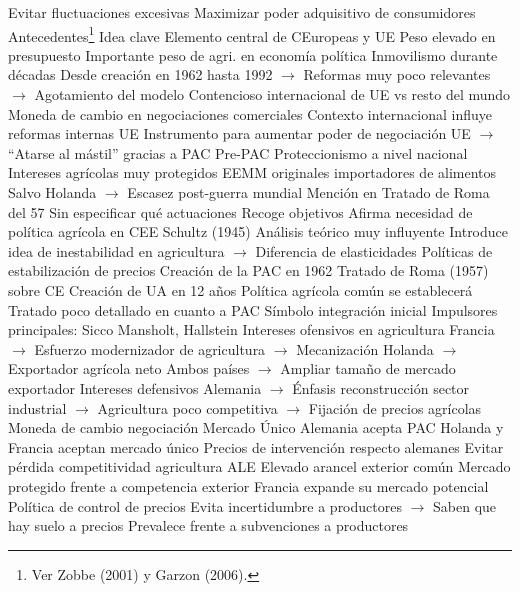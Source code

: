 \documentclass{nuevotema}
\begin{document}
\begin{esquemal}
				\4 Evitar fluctuaciones excesivas
				\4 Maximizar poder adquisitivo de consumidores
		\2 Antecedentes\footnote{Ver Zobbe (2001) y Garzon (2006).}
			\3 Idea clave
				\4 Elemento central de CEuropeas y UE
				\4[] Peso elevado en presupuesto
				\4[] Importante peso de agri. en economía política
				\4 Inmovilismo durante décadas
				\4[] Desde creación en 1962 hasta 1992
				\4[] $\to$ Reformas muy poco relevantes
				\4[] $\to$ Agotamiento del modelo
				\4 Contencioso internacional de UE vs resto del mundo
				\4[] Moneda de cambio en negociaciones comerciales
				\4[] Contexto internacional influye reformas internas UE
				\4[] Instrumento para aumentar poder de negociación UE
				\4[] $\to$ ``Atarse al mástil'' gracias a PAC
			\3 Pre-PAC
				\4 Proteccionismo a nivel nacional
				\4 Intereses agrícolas muy protegidos
				\4 EEMM originales importadores de alimentos
				\4[] Salvo Holanda
				\4[] $\to$ Escasez post-guerra mundial
				\4 Mención en Tratado de Roma del 57
				\4[] Sin especificar qué actuaciones
				\4[] Recoge objetivos
				\4[] Afirma necesidad de política agrícola en CEE
				\4 Schultz (1945)
				\4[] Análisis teórico muy influyente
				\4[] Introduce idea de inestabilidad en agricultura
				\4[] $\to$ Diferencia de elasticidades
				\4[] Políticas de estabilización de precios
			\3 Creación de la PAC en 1962
				\4 Tratado de Roma (1957) sobre CE
				\4[] Creación de UA en 12 años
				\4[] Política agrícola común se establecerá
				\4[] Tratado poco detallado en cuanto a PAC
				\4 Símbolo integración inicial
				\4 Impulsores principales:
				\4[] Sicco Mansholt, Hallstein
				\4 Intereses ofensivos en agricultura
				\4[] Francia
				\4[] $\to$ Esfuerzo modernizador de agricultura
				\4[] $\to$ Mecanización
				\4[] Holanda
				\4[] $\to$ Exportador agrícola neto
				\4[] Ambos países
				\4[] $\to$ Ampliar tamaño de mercado exportador
				\4 Intereses defensivos
				\4[] Alemania
				\4[] $\to$ Énfasis reconstrucción sector industrial
				\4[] $\to$ Agricultura poco competitiva
				\4[] $\to$ Fijación de precios agrícolas
				\4 Moneda de cambio negociación Mercado Único
				\4[] Alemania acepta PAC
				\4[] Holanda y Francia aceptan mercado único
				\4 Precios de intervención respecto alemanes
				\4[] Evitar pérdida competitividad agricultura ALE
				\4 Elevado arancel exterior común
				\4[] Mercado protegido frente a competencia exterior
				\4[] Francia expande su mercado potencial
				\4 Política de control de precios
				\4[] Evita incertidumbre a productores
				\4[] $\to$ Saben que hay suelo a precios
				\4[] Prevalece frente a subvenciones a productores

\end{esquemal}
\end{document}
